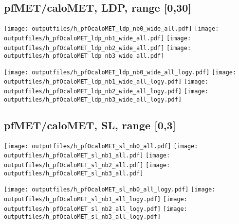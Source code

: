 \documentclass[11pt]{article}
\begin{document}

    \subsection{ pfMET/caloMET, LDP, range [0,30]}

    \noindent
     \texttt{[image: outputfiles/h\_pfOcaloMET\_ldp\_nb0\_wide\_all.pdf]}
     \texttt{[image: outputfiles/h\_pfOcaloMET\_ldp\_nb1\_wide\_all.pdf]}
     \texttt{[image: outputfiles/h\_pfOcaloMET\_ldp\_nb2\_wide\_all.pdf]}
     \texttt{[image: outputfiles/h\_pfOcaloMET\_ldp\_nb3\_wide\_all.pdf]}

    \noindent
     \texttt{[image: outputfiles/h\_pfOcaloMET\_ldp\_nb0\_wide\_all\_logy.pdf]}
     \texttt{[image: outputfiles/h\_pfOcaloMET\_ldp\_nb1\_wide\_all\_logy.pdf]}
     \texttt{[image: outputfiles/h\_pfOcaloMET\_ldp\_nb2\_wide\_all\_logy.pdf]}
     \texttt{[image: outputfiles/h\_pfOcaloMET\_ldp\_nb3\_wide\_all\_logy.pdf]}

    \clearpage



    \subsection{ pfMET/caloMET, SL, range [0,3]}

    \noindent
     \texttt{[image: outputfiles/h\_pfOcaloMET\_sl\_nb0\_all.pdf]}
     \texttt{[image: outputfiles/h\_pfOcaloMET\_sl\_nb1\_all.pdf]}
     \texttt{[image: outputfiles/h\_pfOcaloMET\_sl\_nb2\_all.pdf]}
     \texttt{[image: outputfiles/h\_pfOcaloMET\_sl\_nb3\_all.pdf]}

    \noindent
     \texttt{[image: outputfiles/h\_pfOcaloMET\_sl\_nb0\_all\_logy.pdf]}
     \texttt{[image: outputfiles/h\_pfOcaloMET\_sl\_nb1\_all\_logy.pdf]}
     \texttt{[image: outputfiles/h\_pfOcaloMET\_sl\_nb2\_all\_logy.pdf]}
     \texttt{[image: outputfiles/h\_pfOcaloMET\_sl\_nb3\_all\_logy.pdf]}

    \clearpage



\end{document}
